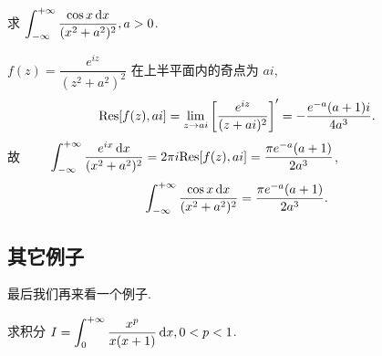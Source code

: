 \documentclass[nocolor,theme=doremi,lang=cn,11pt,chinese,twoside,openright,usesamecnt]{elegantbook}
\begin{document}
\begin{example}
	求 $\displaystyle\int_{-\infty}^{+\infty}\frac{\cos x\,\mathrm{d} x}{(x^2+a^2)^2}, a>0$.
\end{example}

\begin{solution}
	$f(z)=\dfrac{e^{iz}}{(z^2+a^2)^2}$ 在上半平面内的奇点为 $ai$,
	{
		\[{\mathrm{Res}}[f(z),ai]=\lim_{z\to ai}\left[\frac{e^{iz}}{(z+ai)^2}\right]'=-\frac{e^{-a}(a+1)i}{4a^3}.\]故
		$\displaystyle\qquad \int_{-\infty}^{+\infty}\frac{e^{ix}\,\mathrm{d} x}{(x^2+a^2)^2}=2\pi i {\mathrm{Res}}[f(z),ai]=\frac{\pi e^{-a}(a+1)}{2a^3}$,
		\[\int_{-\infty}^{+\infty}\frac{\cos x\,\mathrm{d} x}{(x^2+a^2)^2}=\frac{\pi e^{-a}(a+1)}{2a^3}.\]
	}
\end{solution}

\subsection{其它例子}

最后我们再来看一个例子.

\begin{example}
	求积分 $I=\displaystyle\int_0^{+\infty}\frac{x^p}{x(x+1)}\,\mathrm{d} x,0<p<1$.
\end{example}
\end{document}
